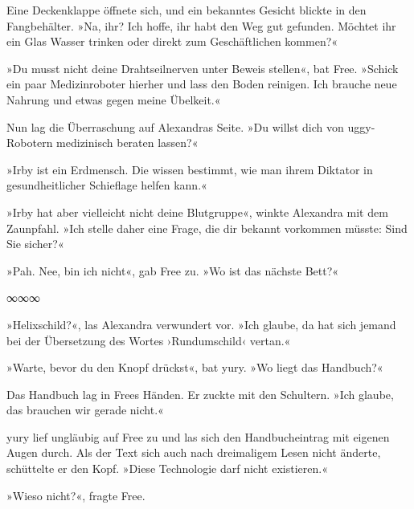 Eine Deckenklappe öffnete sich, und ein bekanntes Gesicht blickte in den Fangbehälter. »Na, ihr? Ich hoffe, ihr habt den Weg gut gefunden. Möchtet ihr ein Glas Wasser trinken oder direkt zum Geschäftlichen kommen?«

»Du musst nicht deine Drahtseilnerven unter Beweis stellen«, bat Free. »Schick ein paar Medizinroboter hierher und lass den Boden reinigen. Ich brauche neue Nahrung und etwas gegen meine Übelkeit.«

Nun lag die Überraschung auf Alexandras Seite. »Du willst dich von uggy-Robotern medizinisch beraten lassen?«

»Irby ist ein Erdmensch. Die wissen bestimmt, wie man ihrem Diktator in gesundheitlicher Schieflage helfen kann.«

»Irby hat aber vielleicht nicht deine Blutgruppe«, winkte Alexandra mit dem Zaunpfahl. »Ich stelle daher eine Frage, die dir bekannt vorkommen müsste: Sind Sie sicher?«

»Pah. Nee, bin ich nicht«, gab Free zu. »Wo ist das nächste Bett?«

\begin{center}
∞∞∞
\end{center}

»Helixschild?«, las Alexandra verwundert vor. »Ich glaube, da hat sich jemand bei der Übersetzung des Wortes ›Rundumschild‹ vertan.«

»Warte, bevor du den Knopf drückst«, bat yury. »Wo liegt das Handbuch?«

Das Handbuch lag in Frees Händen.  Er zuckte mit den Schultern. »Ich glaube, das brauchen wir gerade nicht.«

yury lief ungläubig auf Free zu und las sich den Handbucheintrag mit eigenen Augen durch. Als der Text sich auch nach dreimaligem Lesen nicht änderte, schüttelte er den Kopf. »Diese Technologie darf nicht existieren.«

»Wieso nicht?«, fragte Free.


